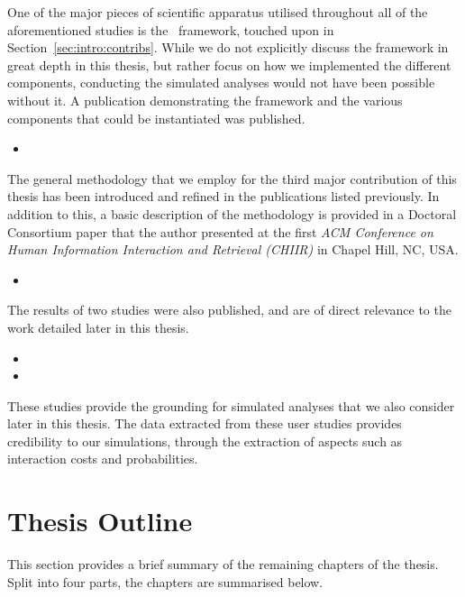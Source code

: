 \noindent
{}
One of the major pieces of scientific apparatus utilised throughout all of the aforementioned studies is the \simiir~framework, touched upon in Section~\ref{sec:intro:contribs}. While we do not explicitly discuss the framework in great depth in this thesis, but rather focus on how we implemented the different components, conducting the simulated analyses would not have been possible without it. A publication demonstrating the framework and the various components that could be instantiated was published.

\begin{itemize}
    \item{}
\end{itemize}

\noindent
{}
The general methodology that we employ for the third major contribution of this thesis has been introduced and refined in the publications listed previously. In addition to this, a basic description of the methodology is provided in a Doctoral Consortium paper that the author presented at the first \emph{ACM Conference on Human Information Interaction and Retrieval (CHIIR)} in Chapel Hill, NC, USA.

\begin{itemize}
    \item{}
\end{itemize}

The results of two studies were also published, and are of direct relevance to the work detailed later in this thesis.

\begin{itemize}
    \item{}
    \item{}
\end{itemize}

These studies provide the grounding for simulated analyses that we also consider later in this thesis. The data extracted from these user studies provides credibility to our simulations, through the extraction of aspects such as interaction costs and probabilities.

\section{Thesis Outline}
This section provides a brief summary of the remaining chapters of the thesis. Split into four parts, the chapters are summarised below.

